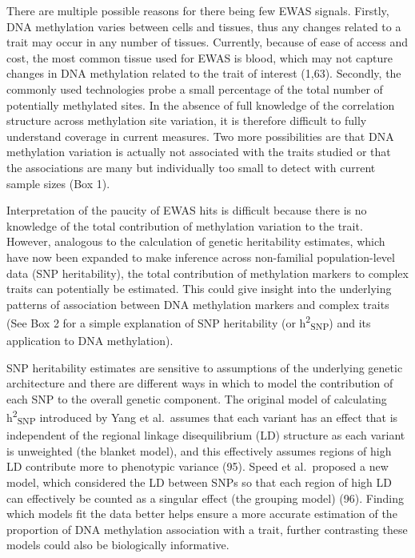 \documentclass[11pt,oneside]{bristolthesis}
\begin{document}
There are multiple possible reasons for there being few EWAS signals. Firstly, DNA methylation varies between cells and tissues, thus any changes related to a trait may occur in any number of tissues. Currently, because of ease of access and cost, the most common tissue used for EWAS is blood, which may not capture changes in DNA methylation related to the trait of interest (1,63). Secondly, the commonly used technologies probe a small percentage of the total number of potentially methylated sites. In the absence of full knowledge of the correlation structure across methylation site variation, it is therefore difficult to fully understand coverage in current measures. Two more possibilities are that DNA methylation variation is actually not associated with the traits studied or that the associations are many but individually too small to detect with current sample sizes (Box 1).

Interpretation of the paucity of EWAS hits is difficult because there is no knowledge of the total contribution of methylation variation to the trait. However, analogous to the calculation of genetic heritability estimates, which have now been expanded to make inference across non-familial population-level data (SNP heritability), the total contribution of methylation markers to complex traits can potentially be estimated. This could give insight into the underlying patterns of association between DNA methylation markers and complex traits (See Box 2 for a simple explanation of SNP heritability (or h\textsuperscript{2}\textsubscript{SNP}) and its application to DNA methylation).

SNP heritability estimates are sensitive to assumptions of the underlying genetic architecture and there are different ways in which to model the contribution of each SNP to the overall genetic component. The original model of calculating h\textsuperscript{2}\textsubscript{SNP} introduced by Yang et al.~assumes that each variant has an effect that is independent of the regional linkage disequilibrium (LD) structure as each variant is unweighted (the blanket model), and this effectively assumes regions of high LD contribute more to phenotypic variance (95). Speed et al.~proposed a new model, which considered the LD between SNPs so that each region of high LD can effectively be counted as a singular effect (the grouping model) (96). Finding which models fit the data better helps ensure a more accurate estimation of the proportion of DNA methylation association with a trait, further contrasting these models could also be biologically informative.
\end{document}
